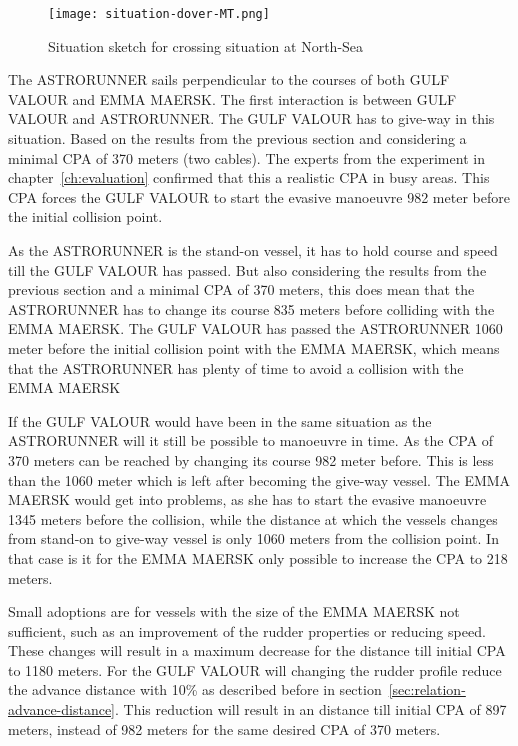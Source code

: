 \begin{figure}[p]
	\centering
	\texttt{[image: situation-dover-MT.png]}
	\caption{Situation sketch for crossing situation at North-Sea}
	\label{fig:crossing-dover-MT}
\end{figure}

The ASTRORUNNER sails perpendicular to the courses of both GULF VALOUR and EMMA MAERSK. The first interaction is between GULF VALOUR and ASTRORUNNER. The GULF VALOUR has to give-way in this situation. Based on the results from the previous section and considering a minimal CPA of 370 meters (two cables). The experts from the experiment in chapter~\ref{ch:evaluation} confirmed that this a realistic CPA in busy areas.
This CPA forces the GULF VALOUR to start the evasive manoeuvre 982 meter before the initial collision point. 

As the ASTRORUNNER is the stand-on vessel, it has to hold course and speed till the GULF VALOUR has passed. But also considering the results from the previous section and a minimal CPA of 370 meters, this does mean that the ASTRORUNNER has to change its course 835 meters before colliding with the EMMA MAERSK. The GULF VALOUR has passed the ASTRORUNNER 1060 meter before the initial collision point with the EMMA MAERSK, which means that the ASTRORUNNER has plenty of time to avoid a collision with the EMMA MAERSK

If the GULF VALOUR would have been in the same situation as the ASTRORUNNER will it still be possible to manoeuvre in time. As the CPA of 370 meters can be reached by changing its course 982 meter before. This is less than the 1060 meter which is left after becoming the give-way vessel. 
The EMMA MAERSK would get into problems, as she has to start the evasive manoeuvre 1345 meters before the collision, while the distance at which the vessels changes from stand-on to give-way vessel is only 1060 meters from the collision point. In that case is it for the EMMA MAERSK only possible to increase the CPA to 218 meters.

Small adoptions are for vessels with the size of the EMMA MAERSK not sufficient, such as an improvement of the rudder properties or reducing speed. These changes will result in a maximum decrease for the distance till initial CPA to 1180 meters. For the GULF VALOUR will changing the rudder profile reduce the advance distance with 10\% as described before in section~\ref{sec:relation-advance-distance}. This reduction will result in an distance till initial CPA of 897 meters, instead of 982 meters for the same desired CPA of 370 meters.

